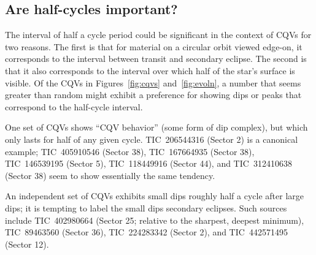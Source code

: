\documentclass[11pt,twocolumn,tighten]{aastex63}
\begin{document}
%


\subsection{Are half-cycles important?}

The interval of half a cycle period could be significant in the
context of CQVs for two reasons.  The first is that for material on a
circular orbit viewed edge-on, it corresponds to the interval between
transit and secondary eclipse.  The second is that it also corresponds
to the interval over which half of the star's surface is visible.  Of
the CQVs in Figures~\ref{fig:cqvs} and~\ref{fig:evoln}, a number that
seems greater than random might exhibit a preference for showing dips
or peaks that correspond to the half-cycle interval.

One set of CQVs shows ``CQV behavior'' (some form of dip complex), but
which only lasts for half of any given cycle.  TIC~206544316 (Sector
2) is a canonical example; TIC~405910546 (Sector 38), TIC~167664935
(Sector 38), TIC~146539195 (Sector 5), TIC~118449916 (Sector 44), and
TIC~312410638 (Sector 38) seem to show essentially the same tendency.

An independent set of CQVs exhibits small dips roughly half a cycle
after large dips; it is tempting to label the small dips secondary
eclipses.  Such sources include TIC~402980664 (Sector 25; relative to
the sharpest, deepest minimum), TIC~89463560 (Sector 36),
TIC~224283342 (Sector 2), and TIC~442571495 (Sector 12).
\end{document}
